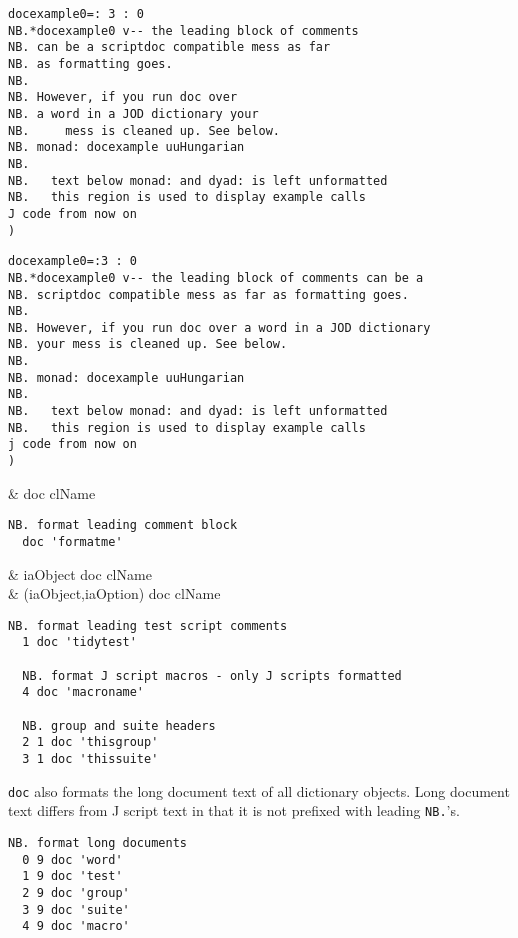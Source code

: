 \begin{lstlisting}[frame=single,framerule=0pt]
docexample0=: 3 : 0
NB.*docexample0 v-- the leading block of comments
NB. can be a scriptdoc compatible mess as far
NB. as formatting goes.
NB.
NB. However, if you run doc over
NB. a word in a JOD dictionary your 
NB.     mess is cleaned up. See below.
NB. monad: docexample uuHungarian
NB.
NB.   text below monad: and dyad: is left unformatted
NB.   this region is used to display example calls
J code from now on
) 
\end{lstlisting}

\begin{lstlisting}[frame=single,framerule=0pt]
docexample0=:3 : 0
NB.*docexample0 v-- the leading block of comments can be a
NB. scriptdoc compatible mess as far as formatting goes.
NB.
NB. However, if you run doc over a word in a JOD dictionary
NB. your mess is cleaned up. See below.
NB.
NB. monad: docexample uuHungarian
NB.
NB.   text below monad: and dyad: is left unformatted
NB.   this region is used to display example calls
j code from now on
) 
\end{lstlisting}

\begin{wordhead}
\monad & doc clName \\
\end{wordhead}
\begin{lstlisting}[frame=single,framerule=0pt]
  NB. format leading comment block 
  doc 'formatme' 
\end{lstlisting}

\begin{wordhead}
\dyad & iaObject doc clName  \\
      & (iaObject,iaOption) doc clName \\
\end{wordhead}
\begin{lstlisting}[frame=single,framerule=0pt]
  NB. format leading test script comments
  1 doc 'tidytest'
  
  NB. format J script macros - only J scripts formatted
  4 doc 'macroname'
  
  NB. group and suite headers
  2 1 doc 'thisgroup'
  3 1 doc 'thissuite'
\end{lstlisting} 
  
\texttt{doc} also formats the long document text of all dictionary objects.
Long document text differs from J script
text in that it is not prefixed with leading \verb|NB.|'s.
  
\begin{lstlisting}[frame=single,framerule=0pt]
  NB. format long documents
  0 9 doc 'word'
  1 9 doc 'test'
  2 9 doc 'group'
  3 9 doc 'suite'
  4 9 doc 'macro'
\end{lstlisting}  



